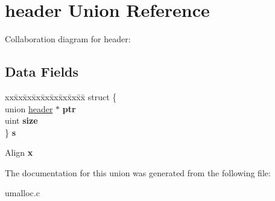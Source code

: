 \hypertarget{unionheader}{}\section{header Union Reference}
\label{unionheader}


Collaboration diagram for header\+:
\subsection*{Data Fields}
\begin{DoxyCompactItemize}
\item 
\mbox{\label{unionheader_a285eb3e439ca5d5334d7177dcd866c22}} 
\begin{tabbing}
xx\=xx\=xx\=xx\=xx\=xx\=xx\=xx\=xx\=\kill
struct \{\\
\>union \mbox{\hyperlink{unionheader}{header}} $\ast$ {\bfseries ptr}\\
\>uint {\bfseries size}\\
\} {\bfseries s}\\

\end{tabbing}\item 
\mbox{\label{unionheader_a2f321dbb657408f93d0c585f55951bdb}} 
Align {\bfseries x}
\end{DoxyCompactItemize}


The documentation for this union was generated from the following file\+:\begin{DoxyCompactItemize}
\item 
umalloc.\+c\end{DoxyCompactItemize}
